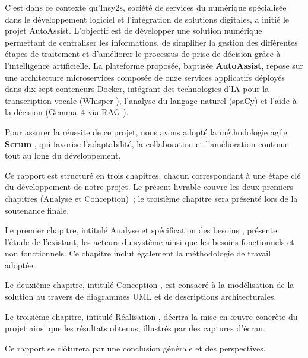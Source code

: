\indent C'est dans ce contexte qu'Insy2s, soci\'{e}t\'{e} de services du num\'{e}rique sp\'{e}cialis\'{e}e dans le d\'{e}veloppement logiciel et l'int\'{e}gration de solutions digitales, a initi\'{e} le projet AutoAssist. L'objectif est de d\'{e}velopper une solution num\'{e}rique permettant de centraliser les informations, de simplifier la gestion des diff\'{e}rentes \'{e}tapes de traitement et d'am\'{e}liorer le processus de prise de d\'{e}cision gr\^{a}ce \`{a} l'intelligence artificielle. La plateforme propos\'{e}e, baptis\'{e}e \textbf{AutoAssist}, repose sur une architecture microservices \cite{microservices} compos\'{e}e de onze services applicatifs d\'{e}ploy\'{e}s dans dix-sept conteneurs Docker, int\'{e}grant des technologies d'IA pour la transcription vocale (Whisper \cite{whisper}), l'analyse du langage naturel (spaCy) et l'aide \`{a} la d\'{e}cision (Gemma~4 \cite{gemma} via RAG \cite{rag}).

\indent Pour assurer la r\'{e}ussite de ce projet, nous avons adopt\'{e} la m\'{e}thodologie agile \textbf{Scrum} \cite{scrum}, qui favorise l'adaptabilit\'{e}, la collaboration et l'am\'{e}lioration continue tout au long du d\'{e}veloppement.

\indent Ce rapport est structur\'{e} en trois chapitres, chacun correspondant \`{a} une \'{e}tape cl\'{e} du d\'{e}veloppement de notre projet. Le pr\'{e}sent livrable couvre les deux premiers chapitres (Analyse et Conception)~; le troisi\`{e}me chapitre sera pr\'{e}sent\'{e} lors de la soutenance finale.

\indent Le premier chapitre, intitul\'{e} \og Analyse et sp\'{e}cification des besoins \fg{}, pr\'{e}sente l'\'{e}tude de l'existant, les acteurs du syst\`{e}me ainsi que les besoins fonctionnels et non fonctionnels. Ce chapitre inclut \'{e}galement la m\'{e}thodologie de travail adopt\'{e}e.

\indent Le deuxi\`{e}me chapitre, intitul\'{e} \og Conception \fg{}, est consacr\'{e} \`{a} la mod\'{e}lisation de la solution au travers de diagrammes UML et de descriptions architecturales.

\indent Le troisi\`{e}me chapitre, intitul\'{e} \og R\'{e}alisation \fg{}, d\'{e}crira la mise en \oe uvre concr\`{e}te du projet ainsi que les r\'{e}sultats obtenus, illustr\'{e}s par des captures d'\'{e}cran.

\indent Ce rapport se cl\^{o}turera par une conclusion g\'{e}n\'{e}rale et des perspectives.
